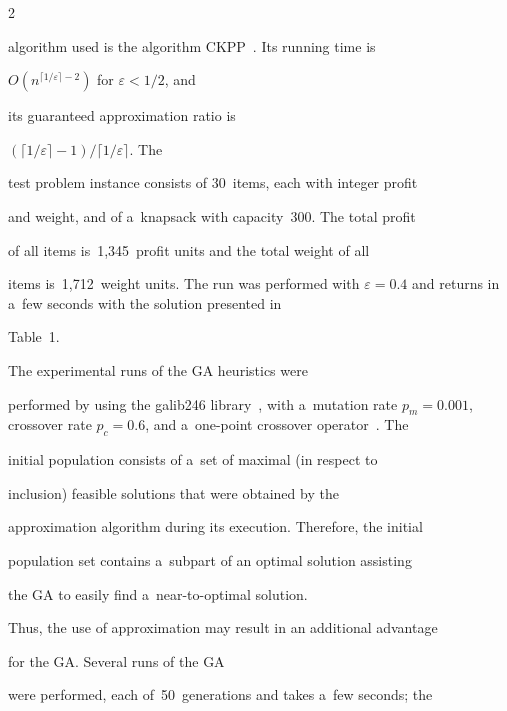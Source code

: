 \begin{multicols}{2}
\noindent


 algorithm used is the algorithm CKPP~\cite{KPP99}. Its running time is


$O\left(n^{\lceil1/\varepsilon\rceil-2}\right)$ for $\varepsilon < 1/2$, and


its guaranteed approximation ratio is


$\left({\lceil1/\varepsilon\rceil-1}\right)/{\lceil1/\varepsilon\rceil}$. The


test problem instance consists of 30~items, each with integer profit


and weight, and of a~knapsack with capacity~300. The total profit


of all items is~1,345~profit units and the total weight of all


items is~1,712~weight units. The run was performed with $\varepsilon


= 0.4$ and returns in a~few seconds with the solution presented in


Table~1.



















The experimental runs of the GA heuristics were


performed by using the galib246 library~\cite{GAlib}, with a~mutation rate $p_{m} = 0.001$, crossover rate $p_{c} = 0.6$, and a~one-point crossover operator~\cite{link-to-the-sofware-cite}. The


initial population consists of a~set of maximal (in respect to


inclusion) feasible solutions that were obtained by the


approximation algorithm during its execution. Therefore, the initial


population set contains a~subpart of an optimal solution assisting


the GA to easily find a~near-to-optimal solution.


Thus, the use of approximation may result in an additional advantage


for the GA. Several runs of the GA


were performed, each of~50~generations and takes a~few seconds; the



\end{multicols}
